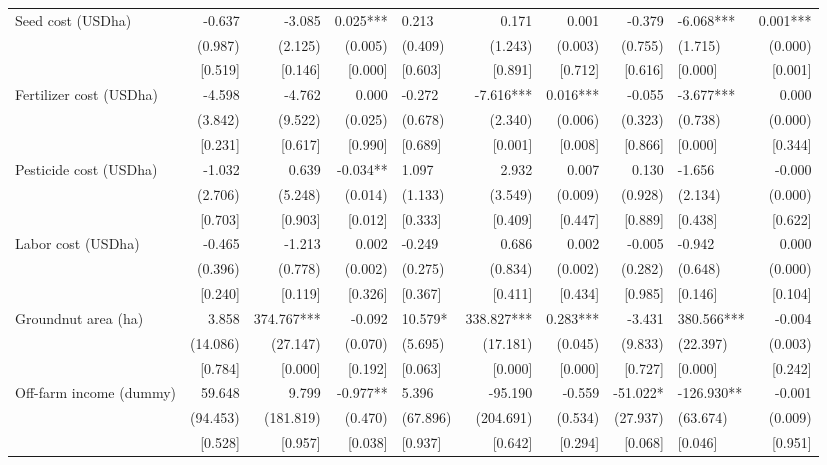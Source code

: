 \documentclass[
]{article}
\begin{document}
\begin{landscape}
\begin{ThreePartTable}
\begin{longtable}[t]{lrrrlrrrlr}
Seed cost (USD\/ha) & -0.637 & -3.085 & 0.025*** & 0.213 & 0.171 & 0.001 & -0.379 & -6.068*** & 0.001***\\
 & (0.987) & (2.125) & (0.005) & (0.409) & (1.243) & (0.003) & (0.755) & (1.715) & (0.000)\\
 & {}[0.519] & {}[0.146] & {}[0.000] & {}[0.603] & {}[0.891] & {}[0.712] & {}[0.616] & {}[0.000] & {}[0.001]\\
Fertilizer cost (USD\/ha) & -4.598 & -4.762 & 0.000 & -0.272 & -7.616*** & 0.016*** & -0.055 & -3.677*** & 0.000\\
 & (3.842) & (9.522) & (0.025) & (0.678) & (2.340) & (0.006) & (0.323) & (0.738) & (0.000)\\
 & {}[0.231] & {}[0.617] & {}[0.990] & {}[0.689] & {}[0.001] & {}[0.008] & {}[0.866] & {}[0.000] & {}[0.344]\\
Pesticide cost (USD\/ha) & -1.032 & 0.639 & -0.034** & 1.097 & 2.932 & 0.007 & 0.130 & -1.656 & -0.000\\
 & (2.706) & (5.248) & (0.014) & (1.133) & (3.549) & (0.009) & (0.928) & (2.134) & (0.000)\\
 & {}[0.703] & {}[0.903] & {}[0.012] & {}[0.333] & {}[0.409] & {}[0.447] & {}[0.889] & {}[0.438] & {}[0.622]\\
Labor cost (USD\/ha) & -0.465 & -1.213 & 0.002 & -0.249 & 0.686 & 0.002 & -0.005 & -0.942 & 0.000\\
 & (0.396) & (0.778) & (0.002) & (0.275) & (0.834) & (0.002) & (0.282) & (0.648) & (0.000)\\
 & {}[0.240] & {}[0.119] & {}[0.326] & {}[0.367] & {}[0.411] & {}[0.434] & {}[0.985] & {}[0.146] & {}[0.104]\\
Groundnut area (ha) & 3.858 & 374.767*** & -0.092 & 10.579* & 338.827*** & 0.283*** & -3.431 & 380.566*** & -0.004\\
 & (14.086) & (27.147) & (0.070) & (5.695) & (17.181) & (0.045) & (9.833) & (22.397) & (0.003)\\
 & {}[0.784] & {}[0.000] & {}[0.192] & {}[0.063] & {}[0.000] & {}[0.000] & {}[0.727] & {}[0.000] & {}[0.242]\\
Off-farm income (dummy) & 59.648 & 9.799 & -0.977** & 5.396 & -95.190 & -0.559 & -51.022* & -126.930** & -0.001\\
 & (94.453) & (181.819) & (0.470) & (67.896) & (204.691) & (0.534) & (27.937) & (63.674) & (0.009)\\
 & {}[0.528] & {}[0.957] & {}[0.038] & {}[0.937] & {}[0.642] & {}[0.294] & {}[0.068] & {}[0.046] & {}[0.951]\\

\end{longtable}
\end{ThreePartTable}
\end{landscape}
\end{document}
